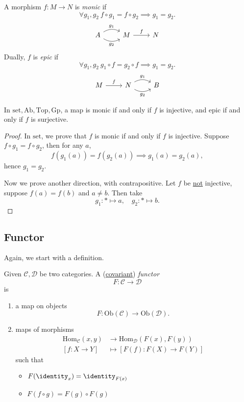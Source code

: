 \begin{definition}
	A morphism \(f\colon M\to N\) is \emph{monic} if
	\[
		\forall g_1, g_2\ f\circ g_1 = f\circ g_2 \implies g_1 = g_2.
	\]
	\[
		\begin{tikzcd}
			A\ar[r, bend left, "g_1"]\ar[r, bend right, "g_2"']& M \ar[r, "f"]& N
		\end{tikzcd}
	\]
	Dually, \(f\) is \emph{epic} if
	\[
		\forall g_1, g_2\ g_{1} \circ f = g_2 \circ f \implies g_1 = g_2.
	\]
	\[
		\begin{tikzcd}
			M\ar[r, "f"]& N\ar[r, bend left, "g_1"]\ar[r, bend right, "g_2"']& B
		\end{tikzcd}
	\]
\end{definition}

\begin{lemma}
	In \(\mathrm{set}, \mathrm{Ab} , \mathrm{Top} , \mathrm{Gp}  \), a map is monic if and only if \(f\) is injective, and epic if and
	only if \(f\) is surjective.
\end{lemma}
\begin{proof}
	In \(\mathrm{set} \), we prove that \(f\) is monic if and only if \(f\) is injective. Suppose
	\(f\circ g_1 = f\circ g_2\), then for any \(a\),
	\[
		f(g_1(a)) = f(g_2(a))\implies g_1(a) = g_2(a),
	\]
	hence \(g_1 = g_2\).

	\par Now we prove another direction, with contrapositive. Let \(f\) be \underline{not} injective, suppose
	\(f(a) = f(b)\) and \(a\neq b\). Then take
	\[
		g_1\colon *\mapsto a,\quad g_2\colon *\mapsto b.
	\]
\end{proof}

\subsection{Functor}
Again, we start with a definition.
\begin{definition}[Functor]
	Given \(\mathcal{C} , \mathcal{D} \) be two categories. A (\underline{covariant}) \emph{functor}
	\[
		F\colon \mathcal{C} \to \mathcal{D}
	\]
	is
	\begin{enumerate}
		\item a map on objects
		      \[
			      F\colon \mathrm{Ob}(\mathcal{C} )\to \mathrm{Ob}(\mathcal{D} ).
		      \]
		\item maps of morphisms
		      \[
			      \begin{split}
				      \mathrm{Hom}_{\mathcal{C} }(x, y)&\to \mathrm{Hom}_{\mathcal{D} }(F(x), F(y))\\
				      [f\colon X\to Y] &\mapsto [F(f)\colon F(X)\to F(Y)]
			      \end{split}
		      \]
		      such that
		      \begin{itemize}
			      \item \(F(\identity_{x} ) = \identity_{F(x)} \)
			      \item \(F(f\circ g) = F(g)\circ F(g)\)
		      \end{itemize}
	\end{enumerate}
\end{definition}
